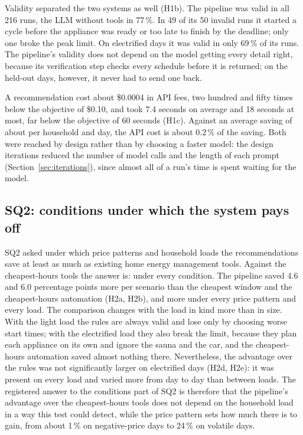 \documentclass[12pt,a4paper]{report}
\begin{document}
Validity separated the two systems as well (H1b). The pipeline was
valid in all 216 runs, the LLM without tools in 77\,\%. In 49 of its 50
invalid runs it started a cycle before the appliance was ready or too
late to finish by the deadline; only one broke the peak limit. On
electrified days it was valid in only 69\,\% of its runs. The
pipeline's validity does not depend on the model getting every detail
right, because its verification step checks every schedule before it
is returned; on the held-out days, however, it never had to send one
back.

A recommendation cost about \$0.0004 in API fees, two hundred and fifty
times below the objective of \$0.10, and took 7.4 seconds on average
and 18 seconds at most, far below the objective of 60 seconds (H1c).
Against an average saving of about  per household and day,
the API cost is about 0.2\,\% of the saving. Both were reached by
design rather than by choosing a faster model: the design iterations
reduced the number of model calls and the length of each prompt
(Section~\ref{sec:iterations}), since almost all of a run's time is
spent waiting for the model.

\subsection{SQ2: conditions under which the system pays off}

SQ2 asked under which price patterns and household loads the
recommendations save at least as much as existing home energy
management tools. Against the cheapest-hours
tools the answer is: under every condition. The pipeline saved 4.6 and
6.0 percentage points more per scenario than the cheapest window and the
cheapest-hours automation (H2a, H2b), and more under every price pattern
and every load. The comparison changes with the load in kind more than
in size. With the light load the rules are always valid and lose only by
choosing worse start times; with the electrified load they also break
the limit, because they plan each appliance on its own and ignore the
sauna and the car, and the cheapest-hours automation saved almost
nothing there. Nevertheless, the advantage over the rules was not
significantly larger on electrified days (H2d, H2e): it was present on
every load and varied more from day to day than between loads. The
registered answer to the conditions part of SQ2 is therefore that the
pipeline's advantage over the cheapest-hours tools does not depend on
the household load in a way this test could detect, while the price
pattern sets how much there is to gain, from about 1\,\% on
negative-price days to 24\,\% on volatile days.
\end{document}

